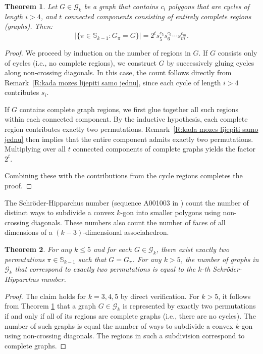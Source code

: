 \documentclass{birkjour}
\newtheorem{thm}{Theorem}[section]
\theoremstyle{definition}
\theoremstyle{remark}
\numberwithin{equation}{section}
\begin{document}
\begin{thm}\label{T:BBB} Let $G\in \mathcal{G}_k$
be a graph that contains $c_i$ polygons that are cycles of length
$i>4$, and $t$ connected components consisting of entirely
complete regions (graphs). Then:
$$\Big|\{\pi\in
    \mathbb{S}_{k-1}:G_\pi=G\}\Big|=2^t s_5^{c_5}s_6^{c_6}
    \cdots s_m^{c_m}.$$
\end{thm}
\begin{proof}We proceed by induction on the number of regions in $G$.
If $G$ consists only of cycles (i.e., no complete regions), we
construct $G$ by successively gluing cycles along non-crossing
diagonals. In this case, the count follows directly from
Remark~\ref{R:kada mozes lijepiti samo jednu}, since each cycle of
length $i>4$ contributes $s_i$.


 If $G$ contains complete graph regions, we first glue together all
 such regions within each connected component.
 By the inductive hypothesis, each complete region contributes exactly two permutations. Remark~\ref{R:kada mozes lijepiti samo jednu}
 then implies that the entire component admits exactly two permutations.
Multiplying over all $t$ connected components of complete graphs
yields the factor $2^t$.

Combining these with the contributions from the cycle regions
completes the proof.
\end{proof}
The Schr\" oder-Hipparchus number (sequence A001003 in
\cite{Sloan}) count the number of distinct ways to subdivide a
convex $k$-gon into smaller polygons using non-crossing diagonals.
These numbers also count the number of faces of all dimensions of
a $(k-3)$-dimensional associahedron.
\begin{thm}For any $k\leq 5$ and for each $G\in\mathcal{G}_k$,
there exist
exactly two permutations $\pi\in \mathbb{S}_{k-1}$ such that
$G=G_\pi$. For any $k > 5$, the number of graphs in
$\mathcal{G}_k$ that correspond to exactly two permutations is
equal to the $k$-th Schr\" oder-Hipparchus number.
\end{thm}
\begin{proof}
The claim holds for $k=3,4,5$ by direct verification. For $k>5$,
it follows from Theorem \ref{T:BBB} that a graph $G\in
\mathcal{G}_k$ is represented by exactly two permutations if and
only if all of its regions are complete graphs (i.e., there are no
cycles). The number of such graphs is equal the number of ways to
subdivide a convex $k$-gon using non-crossing diagonals. The
regions in such a subdivision correspond to complete graphs.
\end{proof}
\end{document}
